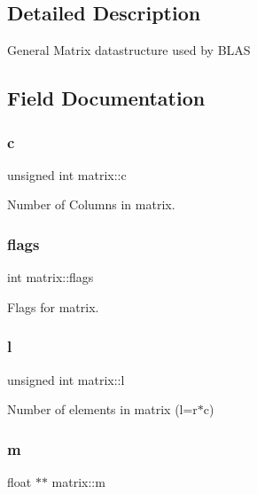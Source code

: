 \subsection{Detailed Description}
General Matrix datastructure used by B\+L\+AS 

\subsection{Field Documentation}
\mbox{\label{structmatrix_a9499b963be4febd5b909822a4d0ae290}} 
\subsubsection{\texorpdfstring{c}{c}}
{\footnotesize\ttfamily unsigned int matrix\+::c}



Number of Columns in matrix. 

\mbox{\label{structmatrix_ab45b487b5fbdfe6df519d054d5acb245}} 
\subsubsection{\texorpdfstring{flags}{flags}}
{\footnotesize\ttfamily int matrix\+::flags}



Flags for matrix. 

\mbox{\label{structmatrix_a5be40caa3b21e52f4c60b0846f1bd6b1}} 
\subsubsection{\texorpdfstring{l}{l}}
{\footnotesize\ttfamily unsigned int matrix\+::l}



Number of elements in matrix (l=r$\ast$c) 

\mbox{\label{structmatrix_af77977cdeb2c0c0590214bcf450f5991}} 
\subsubsection{\texorpdfstring{m}{m}}
{\footnotesize\ttfamily float $\ast$$\ast$ matrix\+::m}



